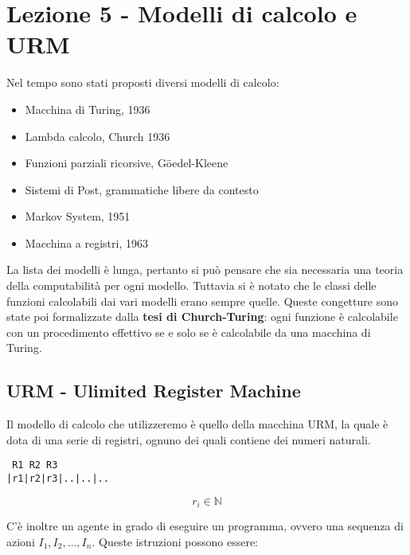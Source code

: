\chapter{Lezione 5 - Modelli di calcolo e URM}\label{lezione-5---modelli-di-calcolo-e-urm}

Nel tempo sono stati proposti diversi modelli di calcolo:

\begin{itemize}
\item
  Macchina di Turing, 1936
\item
  Lambda calcolo, Church 1936
\item
  Funzioni parziali ricorsive, G\"{o}edel-Kleene
\item
  Sistemi di Post, grammatiche libere da contesto
\item
  Markov System, 1951
\item
  Macchina a registri, 1963
\end{itemize}

La lista dei modelli è lunga, pertanto si può pensare che sia necessaria una teoria della computabilità per ogni modello. 
Tuttavia si è notato che le classi delle funzioni calcolabili dai vari modelli erano sempre quelle. 
Queste congetture sono state poi formalizzate dalla \textbf{tesi di Church-Turing}: ogni funzione è calcolabile con un procedimento effettivo se e solo se è calcolabile da una macchina di Turing.

\section{URM - Ulimited Register Machine}\label{urm---ulimited-register-machine}

Il modello di calcolo che utilizzeremo è quello della macchina URM, la quale è dota di una serie di registri, ognuno dei quali contiene dei numeri naturali.

\begin{verbatim}
 R1 R2 R3
|r1|r2|r3|..|..|..
\end{verbatim}

$$r_i \in \mathbb{N}$$

C'è inoltre un agente in grado di eseguire un programma, ovvero una sequenza di azioni $ I_1, I_2, \ldots, I_n$.
Queste istruzioni possono essere:

